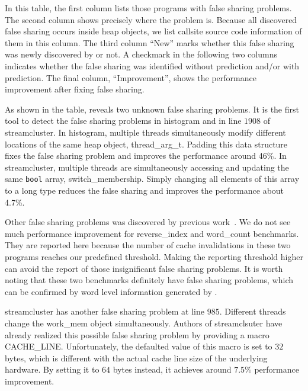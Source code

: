 In this table, the first column lists those programs with false sharing problems.  The second column shows precisely where the problem is. Because all discovered false sharing occurs inside heap objects, we list callsite source code information of them in this column.  The third column ``New'' marks whether this false sharing was newly discovered by \Predator{} or not.  A checkmark in the following two columns indicates whether the false sharing was identified without
prediction and/or with prediction.  The final column, ``Improvement'', shows the performance improvement after fixing false sharing.

As shown in the table, \Predator{} reveals two unknown false sharing problems. It is the first tool to detect the false sharing problems in histogram and in line $1908$ of streamcluster. 
In histogram, multiple threads simultaneously modify different locations of the same heap object, thread\_arg\_t. 
Padding this data structure fixes the false sharing problem and improves the performance around 46\%. In streamcluster, multiple threads are simultaneously accessing and updating the same \texttt{bool} array, switch\_membership. Simply changing all elements of this array to a long type reduces the false sharing and improves the performance about 4.7\%.

Other false sharing problems was discovered by previous work~\cite{sheriff}. We do not see much performance improvement for reverse\_index and word\_count benchmarks. They are reported here because the number of cache invalidations in these two programs reaches our predefined threshold.
Making the reporting threshold higher can avoid the report of those insignificant false sharing problems.
It is worth noting that these two benchmarks definitely have false sharing problems,
which can be confirmed by word level information generated by \Predator{}. 

streamcluster has another false sharing problem at line $985$. Different threads change the work\_mem object simultaneously. Authors of streamclsuter have already realized this possible false sharing problem by providing a macro CACHE\_LINE. Unfortunately, the defaulted value of this macro is set to $32$ bytes, which is different with the actual cache line size of the underlying hardware. By setting it to $64$ bytes instead, it achieves around $7.5\%$ performance improvement.

